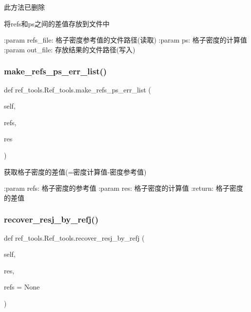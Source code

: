 \begin{DoxyVerb}此方法已删除

将refs和ps之间的差值存放到文件中

:param refs_file: 格子密度参考值的文件路径(读取)
:param ps: 格子密度的计算值
:param out_file: 存放结果的文件路径(写入)
\end{DoxyVerb}
 \mbox{\label{classref__tools_1_1Ref__tools_a2e7754b9256b80b077036b83664d171d}} 
\subsubsection{\texorpdfstring{make\+\_\+refs\+\_\+ps\+\_\+err\+\_\+list()}{make\_refs\_ps\_err\_list()}}
{\footnotesize\ttfamily def ref\+\_\+tools.\+Ref\+\_\+tools.\+make\+\_\+refs\+\_\+ps\+\_\+err\+\_\+list (\begin{DoxyParamCaption}\item[{}]{self,  }\item[{}]{refs,  }\item[{}]{res }\end{DoxyParamCaption})}

\begin{DoxyVerb}获取格子密度的差值(=密度计算值-密度参考值)

:param refs: 格子密度的参考值
:param res: 格子密度的计算值
:return: 格子密度的差值
\end{DoxyVerb}
 \mbox{\label{classref__tools_1_1Ref__tools_add98e1a86c0220edb3d10ee2b230a95f}} 
\subsubsection{\texorpdfstring{recover\+\_\+resj\+\_\+by\+\_\+refj()}{recover\_resj\_by\_refj()}}
{\footnotesize\ttfamily def ref\+\_\+tools.\+Ref\+\_\+tools.\+recover\+\_\+resj\+\_\+by\+\_\+refj (\begin{DoxyParamCaption}\item[{}]{self,  }\item[{}]{res,  }\item[{}]{refs = {\ttfamily None} }\end{DoxyParamCaption})}

